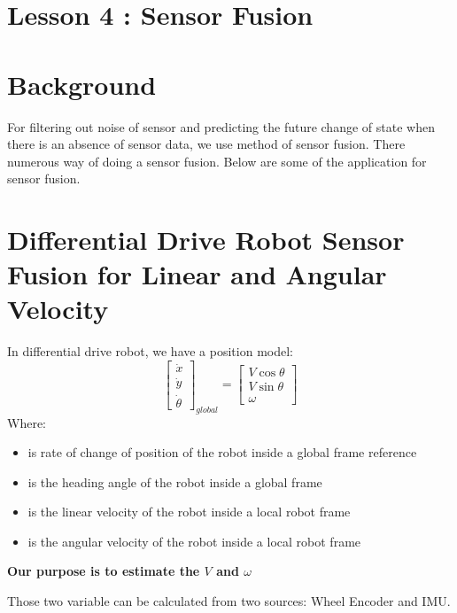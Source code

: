 \documentclass[12pt,a4paper]{article}
\begin{document}
	\section*{\centering Lesson 4 : Sensor Fusion}
	\section{Background}
	For filtering out noise of sensor and predicting the future change of state when there is an absence of sensor data, we use method of sensor fusion. There numerous way of doing a sensor fusion. Below are some of the application for sensor fusion. 
	
	\section{Differential Drive Robot Sensor Fusion for Linear and Angular Velocity}
	In differential drive robot, we have a position model:
	\begin{equation}
		\begin{bmatrix}
			\dot{x}      \\
			\dot{y}      \\
			\dot{\theta} 
		\end{bmatrix}_{global}=
		\begin{bmatrix}
			V \cos \theta \\
			V \sin \theta \\
			\omega        
		\end{bmatrix}
		\label{eq1}
	\end{equation}
	Where:
	\begin{itemize}
		\item { is rate of change of position of the robot inside a global frame reference}
		\item {\makebox[2cm]{\(\theta\)\hfill} is the heading angle of the robot inside a global frame}
		\item { is the linear velocity of the robot inside a local robot frame}
		\item {\makebox[2cm]{\(\omega\)\hfill} is the angular velocity of the robot inside a local robot frame}
	\end{itemize}
	\begin{center}
		\textbf{Our purpose is to estimate the \(V\) and \(\omega\)}
	\end{center}
	Those two variable can be calculated from two sources: Wheel Encoder and IMU.\\
\end{document}
